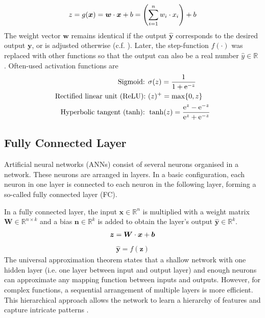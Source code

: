 %
\begin{align}\eqlbl{nn}%
	z = g(\boldsymbol{x}) = \boldsymbol{w} \cdot \boldsymbol{x} + b = \left( \sum_{i=1}^{n}w_i \cdot x_i \right) + b
\end{align}
%
The weight vector $\boldsymbol{w}$ remains identical if the output $\boldsymbol{\hat{y}}$ corresponds to the desired output $\boldsymbol{y}$, or is adjusted otherwise (c.f. ). Later, the step-function \(f(\cdot)\) was replaced with other functions so that the output can also be a real number \(\hat{y} \in \mathbb{R}\) . Often-used activation functions are
%
\begin{align}\eqlbl{act_functions}%
		\text{Sigmoid: } & \sigma(z) = \frac{1}{1+\mathrm{e}^{-z}}\\
		\text{Rectified linear unit (ReLU): } & (z)^{+} = \max\{0, z\}\\
		\text{Hyperbolic tangent (tanh): }  & \tanh(z) = \frac{\mathrm{e}^{z}-\mathrm{e}^{-z}}{\mathrm{e}^{z}+\mathrm{e}^{-z}}
\end{align}

\subsection{Fully Connected Layer}
Artificial neural networks (ANNs) consist of several neurons organised in a network. These neurons are arranged in layers. In a basic configuration, each neuron in one layer is connected to each neuron in the following layer, forming a so-called fully connected layer (FC).

In a fully connected layer, the input $\boldsymbol{x} \in \mathbb{R}^n$ is multiplied with a weight matrix $\boldsymbol{W} \in \mathbb{R}^{n\times k}$ and a bias $\boldsymbol{n} \in \mathbb{R}^k$ is added to obtain the layer's output $\boldsymbol{\hat{y}} \in \mathbb{R}^k$.
\begin{align}\eqlbl{nn3}%
	\boldsymbol{z} = \boldsymbol{W} \cdot \boldsymbol{x} + \boldsymbol{b}
\end{align}
\begin{align}
	\hat{\boldsymbol{y}} = f(\boldsymbol{z})
\end{align}
%
The universal approximation theorem  states that a shallow network with one hidden layer (i.e. one layer between input and output layer) and enough neurons can approximate any mapping function between inputs and outputs.
However, for complex functions, a sequential arrangement of multiple layers is more efficient. This hierarchical approach allows the network to learn a hierarchy of features and capture intricate patterns .

